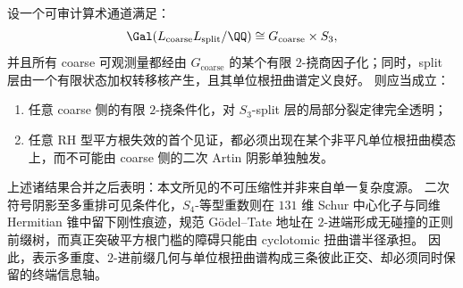 \begin{conjecture}\label{conj:conclusion-artin-shadow-cyclotomic-twist-dichotomy}
设一个可审计算术通道满足：
\[
\Gal(L_{\mathrm{coarse}}L_{\mathrm{split}}/\QQ)
\cong
G_{\mathrm{coarse}}\times S_3,
\]
并且所有 coarse 可观测量都经由 \(G_{\mathrm{coarse}}\) 的某个有限 \(2\)-挠商因子化；同时，split 层由一个有限状态加权转移核产生，且其单位根扭曲谱定义良好。
则应当成立：
\begin{enumerate}
  \item 任意 coarse 侧的有限 \(2\)-挠条件化，对 \(S_3\)-split 层的局部分裂定律完全透明；
  \item 任意 RH 型平方根失效的首个见证，都必须出现在某个非平凡单位根扭曲模态上，而不可能由 coarse 侧的二次 Artin 阴影单独触发。
\end{enumerate}
\end{conjecture}

上述诸结果合并之后表明：本文所见的不可压缩性并非来自单一复杂度源。
二次符号阴影至多重排可见条件化，\(S_4\)-等型重数则在 \(131\) 维 Schur 中心化子与同维 Hermitian 锥中留下刚性痕迹，规范 Gödel--Tate 地址在 \(2\)-进端形成无碰撞的正则前缀树，而真正突破平方根门槛的障碍只能由 cyclotomic 扭曲谱半径承担。
因此，表示多重度、\(2\)-进前缀几何与单位根扭曲谱构成三条彼此正交、却必须同时保留的终端信息轴。
